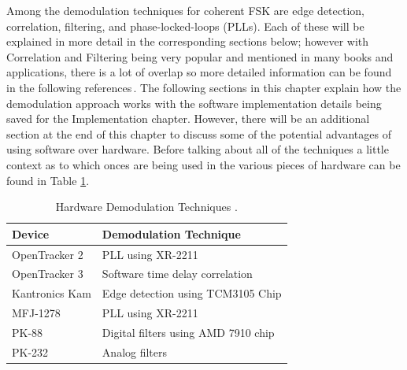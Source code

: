 Among the demodulation techniques for coherent FSK are edge detection, correlation, filtering, and phase-locked-loops (PLLs). Each of these will be explained in more detail in the corresponding sections below; however with Correlation and Filtering being very popular and mentioned in many books and applications, there is a lot of overlap so more detailed information can be found in the following references\,\cite{MarvinK.Simon1995,Sklar1988,J.Das1986,Proakis1983,Seguine2006,Semiconductor}. The following sections in this chapter explain how the demodulation approach works with the software implementation details being saved for the Implementation chapter. However, there will be an additional section at the end of this chapter to discuss some of the potential advantages of using software over hardware. Before talking about all of the techniques a little context as to which onces are being used in the various pieces of hardware can be found in Table \ref{HardwareDemodTechniques}.

\begin{table}
	\begin{center}
		\begin{tabular}{ | l | l | }
			Device & Demodulation Technique \\ \hline
			OpenTracker 2 & PLL using XR-2211 \\ \hline
			OpenTracker 3 & Software time delay correlation \\ \hline
			Kantronics Kam & Edge detection using TCM3105 Chip \\ \hline
			MFJ-1278 & PLL using XR-2211 \\ \hline
			PK-88 & Digital filters using AMD 7910 chip \\ \hline
			PK-232 & Analog filters \\ \hline
		\end{tabular}
		\caption{Hardware Demodulation Techniques \cite{Inc.2001,EXAR1997,Devices1989,Instruments1994,MFJ1278Man,PK88Man}.}
		\label{HardwareDemodTechniques}
	\end{center}
\end{table}

